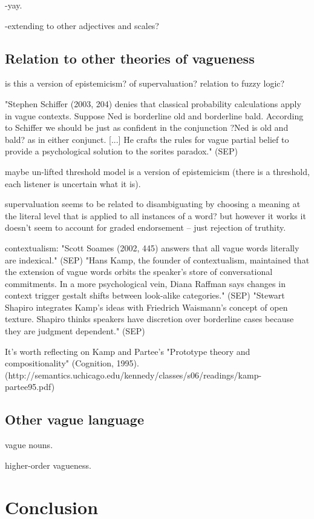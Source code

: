 \documentclass[11pt]{amsart}
\begin{document}
  -yay. 
  
  -extending to other adjectives and scales?
  
 \subsection{Relation to other theories of vagueness}
  
is this a version of epistemicism? of supervaluation? relation to fuzzy logic?

"Stephen Schiffer (2003, 204) denies that classical probability calculations apply in vague contexts. Suppose Ned is borderline old and borderline bald. According to Schiffer we should be just as confident in the conjunction ?Ned is old and bald? as in either conjunct. [...] He crafts the rules for vague partial belief to provide a psychological solution to the sorites paradox." (SEP)
  
 maybe un-lifted threshold model is a version of epistemicism (there is a threshold, each listener is uncertain what it is).
 
supervaluation seems to be related to disambiguating by choosing a meaning at the literal level that is applied to all instances of a word? but however it works it doesn't seem to account for graded endorsement -- just rejection of truthity.

contextualism: "Scott Soames (2002, 445) answers that all vague words literally are indexical." (SEP)
"Hans Kamp, the founder of contextualism, maintained that the extension of vague words orbits the speaker's store of conversational commitments. In a more psychological vein, Diana Raffman says changes in context trigger gestalt shifts between look-alike categories." (SEP)
"Stewart Shapiro integrates Kamp's ideas with Friedrich Waismann's concept of open texture. Shapiro thinks speakers have discretion over borderline cases because they are judgment dependent." (SEP)

It's worth reflecting on Kamp and Partee's "Prototype theory and compositionality" (Cognition, 1995). (http://semantics.uchicago.edu/kennedy/classes/s06/readings/kamp-partee95.pdf)
  
\subsection{Other vague language}

vague nouns. 

higher-order vagueness.

\section{Conclusion}
\end{document}

